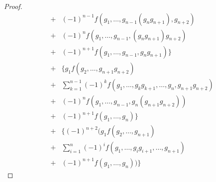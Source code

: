 \documentclass[../master_galois_theory]{subfiles}
\begin{document}
\begin{proof}
\begin{eqnarray*}
  & + & (-1)^{n-1} f(g_1 , \dots , g_{n-1} (g_n g_{n+1}) , g_{n+2}) \\
  & + & (-1)^n f(g_1 , \dots , g_{n-1} , (g_n g_{n+1}) g_{n+2}) \\
  & + & (-1)^{n+1} f(g_1 , \dots , g_{n-1} , g_n g_{n+1}) \} \\
  & + & \{ g_1 f(g_2 , \dots , g_{n+1} g_{n+2}) \\
  & + & \sum_{k=1}^{n-1} (-1)^k f(g_1 , \dots , g_k g_{k+1} , \dots , g_n , g_{n+1} g_{n+2}) \\
  & + & (-1)^n f(g_1 , \dots , g_{n-1} , g_n (g_{n+1} g_{n+2})) \\
  & + & (-1)^{n+1} f(g_1 , \dots , g_n) \} \\
  & + & \{ (-1)^{n+2} (g_1 f(g_2 , \dots , g_{n+1}) \\
  & + & \sum_{i=1}^n (-1)^i f(g_1 , \dots , g_i g_{i+1} , \dots , g_{n+1}) \\
  & + & (-1)^{n+1} f(g_1 , \dots , g_n) ) \}
\end{eqnarray*}
\end{proof}
\end{document}
